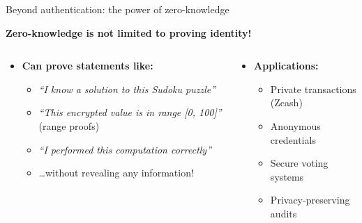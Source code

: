 \documentclass[aspectratio=169, lualatex, handout]{beamer}
\begin{document}
\begin{frame}{Beyond authentication: the power of zero-knowledge}
	\begin{center}
		\textbf{Zero-knowledge is not limited to proving identity!}
	\end{center}
	\vspace{0.25em}
	\begin{columns}[c]
		\begin{column}{0.5\textwidth}
			\begin{itemize}
				\item \textbf{Can prove statements like:}
				      \begin{itemize}
					      \item \textit{``I know a solution to this Sudoku puzzle''}
					      \item \textit{``This encrypted value is in range [0, 100]''} (range proofs)
					      \item \textit{``I performed this computation correctly''}
					      \item \ldots without revealing any information!
				      \end{itemize}
			\end{itemize}
		\end{column}
		\begin{column}{0.5\textwidth}
			\begin{itemize}
				\item \textbf{Applications:}
				      \begin{itemize}
					      \item Private transactions (Zcash)
					      \item Anonymous credentials
					      \item Secure voting systems
					      \item Privacy-preserving audits
				      \end{itemize}
			\end{itemize}
		\end{column}
	\end{columns}
\end{frame}

\incompleteslideswarning

\begin{frame}[plain]
	\titlepage
\end{frame}
\end{document}
